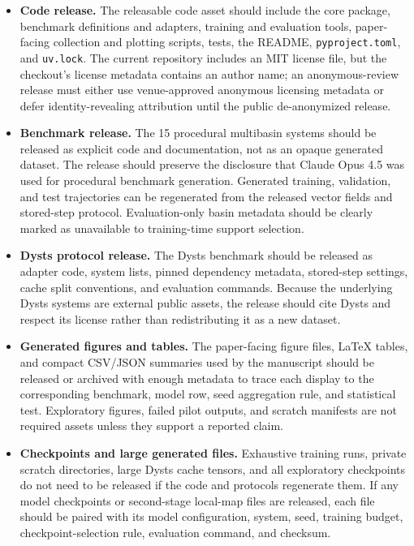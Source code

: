 \begin{itemize}
  \item \textbf{Code release.} The releasable code asset should include the
  core package, benchmark definitions and adapters, training and evaluation
  tools, paper-facing collection and plotting scripts, tests, the README,
  \texttt{pyproject.toml}, and \texttt{uv.lock}. The current repository includes
  an MIT license file, but the checkout's license metadata contains an author
  name; an anonymous-review release must either use venue-approved anonymous
  licensing metadata or defer identity-revealing attribution until the public
  de-anonymized release.

  \item \textbf{Benchmark release.} The 15 procedural multibasin systems should
  be released as explicit code and documentation, not as an opaque generated
  dataset. The release should preserve the disclosure that Claude Opus 4.5 was
  used for procedural benchmark generation. Generated training, validation, and
  test trajectories can be regenerated from the released vector fields and
  stored-step protocol. Evaluation-only basin metadata should be clearly marked
  as unavailable to training-time support selection.

  \item \textbf{Dysts protocol release.} The Dysts benchmark should be released
  as adapter code, system lists, pinned dependency metadata, stored-step
  settings, cache split conventions, and evaluation commands. Because the
  underlying Dysts systems are external public assets, the release should cite
  Dysts and respect its license rather than redistributing it as a new dataset.

  \item \textbf{Generated figures and tables.} The paper-facing figure files,
  LaTeX tables, and compact CSV/JSON summaries used by the manuscript should be
  released or archived with enough metadata to trace each display to the
  corresponding benchmark, model row, seed aggregation rule, and statistical
  test. Exploratory figures, failed pilot outputs, and scratch manifests are not
  required assets unless they support a reported claim.

  \item \textbf{Checkpoints and large generated files.} Exhaustive training
  runs, private scratch directories, large Dysts cache tensors, and all
  exploratory checkpoints do not need to be released if the code and protocols
  regenerate them. If any model checkpoints or second-stage local-map files are
  released, each file should be paired with its model configuration, system,
  seed, training budget, checkpoint-selection rule, evaluation command, and
  checksum.


\end{itemize}

